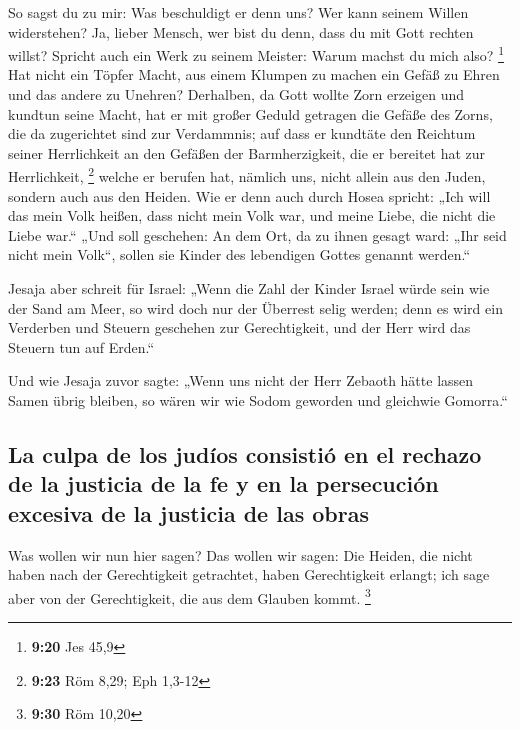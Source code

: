  So sagst du zu mir: Was beschuldigt er denn uns? Wer
kann seinem Willen widerstehen?  Ja, lieber Mensch, wer
bist du denn, dass du mit Gott rechten willst? Spricht auch ein Werk zu
seinem Meister: Warum machst du mich also? \footnote{\textbf{9:20} Jes
  45,9}  Hat nicht ein Töpfer Macht, aus einem Klumpen zu
machen ein Gefäß zu Ehren und das andere zu Unehren? 
Derhalben, da Gott wollte Zorn erzeigen und kundtun seine Macht, hat er
mit großer Geduld getragen die Gefäße des Zorns, die da zugerichtet sind
zur Verdammnis;  auf dass er kundtäte den Reichtum seiner
Herrlichkeit an den Gefäßen der Barmherzigkeit, die er bereitet hat zur
Herrlichkeit, \footnote{\textbf{9:23} Röm 8,29; Eph 1,3-12}
 welche er berufen hat, nämlich uns, nicht allein aus den
Juden, sondern auch aus den Heiden.  Wie er denn auch
durch Hosea spricht: „Ich will das mein Volk heißen, dass nicht mein
Volk war, und meine Liebe, die nicht die Liebe war.`` 
„Und soll geschehen: An dem Ort, da zu ihnen gesagt ward: „Ihr seid
nicht mein Volk``, sollen sie Kinder des lebendigen Gottes genannt
werden.``

 Jesaja aber schreit für Israel: „Wenn die Zahl der
Kinder Israel würde sein wie der Sand am Meer, so wird doch nur der
Überrest selig werden;  denn es wird ein Verderben und
Steuern geschehen zur Gerechtigkeit, und der Herr wird das Steuern tun
auf Erden.``

 Und wie Jesaja zuvor sagte: „Wenn uns nicht der Herr
Zebaoth hätte lassen Samen übrig bleiben, so wären wir wie Sodom
geworden und gleichwie Gomorra.``

\hypertarget{la-culpa-de-los-juduxedos-consistiuxf3-en-el-rechazo-de-la-justicia-de-la-fe-y-en-la-persecuciuxf3n-excesiva-de-la-justicia-de-las-obras}{%
\subsection{La culpa de los judíos consistió en el rechazo de la
justicia de la fe y en la persecución excesiva de la justicia de las
obras}\label{la-culpa-de-los-juduxedos-consistiuxf3-en-el-rechazo-de-la-justicia-de-la-fe-y-en-la-persecuciuxf3n-excesiva-de-la-justicia-de-las-obras}}

 Was wollen wir nun hier sagen? Das wollen wir sagen: Die
Heiden, die nicht haben nach der Gerechtigkeit getrachtet, haben
Gerechtigkeit erlangt; ich sage aber von der Gerechtigkeit, die aus dem
Glauben kommt. \footnote{\textbf{9:30} Röm 10,20}

